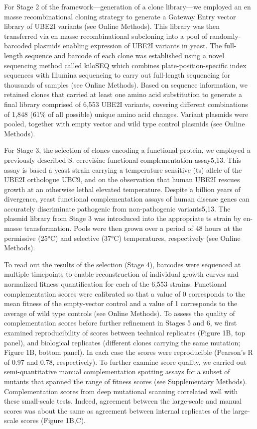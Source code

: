 For Stage 2 of the framework—generation of a clone library—we employed an en masse recombinational cloning strategy to generate a Gateway Entry vector library of UBE2I variants (see Online Methods). This library was then transferred via en masse recombinational subcloning into a pool of randomly-barcoded plasmids enabling expression of UBE2I variants in yeast. The full-length sequence and barcode of each clone was established using a novel sequencing method called kiloSEQ which combines plate-position-specific index sequences with Illumina sequencing to carry out full-length sequencing for thousands of samples (see Online Methods). Based on sequence information, we retained clones that carried at least one amino acid substitution to generate a final library comprised of 6,553 UBE2I variants, covering different combinations of 1,848 (61\% of all possible) unique amino acid changes. Variant plasmids were pooled, together with empty vector and wild type control plasmids (see Online Methods).

For Stage 3, the selection of clones encoding a functional protein, we employed a previously described S. cerevisiae functional complementation assay5,13. This assay is based a yeast strain carrying a temperature sensitive (ts) allele of the UBE2I orthologue UBC9, and on the observation that human UBE2I rescues growth at an otherwise lethal elevated temperature.  Despite a billion years of divergence, yeast functional complementation assays of human disease genes can accurately discriminate pathogenic from non-pathogenic variants5,13.  The plasmid library from Stage 3 was introduced into the appropriate ts strain by en-masse transformation. Pools were then grown over a period of 48 hours at the permissive (25°C) and selective (37°C) temperatures, respectively (see Online Methods).

To read out the results of the selection (Stage 4), barcodes were sequenced at multiple timepoints to enable reconstruction of individual growth curves and normalized fitness quantification for each of the 6,553 strains. Functional complementation scores were calibrated so that a value of 0 corresponds to the mean fitness of the empty-vector control and a value of 1 corresponds to the average of wild type controls (see Online Methods).
To assess the quality of complementation scores before further refinement in Stages 5 and 6, we first examined reproducibility of scores between technical replicates (Figure 1B, top panel), and biological replicates (different clones carrying the same mutation; Figure 1B, bottom panel).  In each case the scores were reproducible (Pearson’s R of 0.97 and 0.78, respectively).   To further examine score quality, we carried out semi-quantitative manual complementation spotting assays for a subset of mutants that spanned the range of fitness scores (see Supplementary Methods). Complementation scores from deep mutational scanning correlated well with these small-scale tests. Indeed, agreement between the large-scale and manual scores was about the same as agreement between internal replicates of the large-scale scores (Figure 1B,C). 

